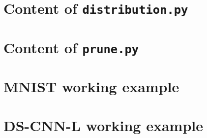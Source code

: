 \begin{appendices}

\chapter{Content of \texttt{distribution.py}}\label{appendix:distribution.py}


\chapter{Content of \texttt{prune.py}}\label{appendix:prune.py}


\chapter{MNIST working example}

\chapter{DS-CNN-L working example}

\end{appendices}
